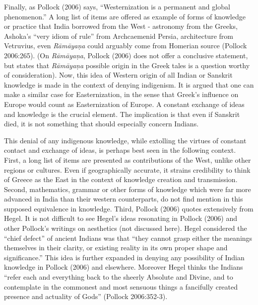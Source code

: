 Finally, as Pollock (2006) says, “Westernization is a permanent and global phenomenon.” A long list of items are offered as example of forms of knowledge or practice that India borrowed from the West - astronomy from the Greeks, Ashoka’s “very idiom of rule” from  Archcaemenid Persia, architecture from Vetruvius, even {\sl Rāmāyaṇa} could arguably come from Homerian source (Pollock 2006:265). (On  {\sl Rāmāyaṇa}, Pollock (2006) does not offer a conclusive statement, but states that {\sl Rāmāyaṇa} possible origin in the Greek tales is a question worthy of consideration). Now, this idea of Western origin of all Indian or Sanskrit knowledge is made in the context of denying indigenism. It is argued that one can make a similar case for Easternization, in the sense that Greek’s influence on Europe would count as Easternization of Europe. A constant exchange of ideas and knowledge is the crucial element. The implication is that even if Sanskrit died, it is not something that should especially concern Indians.

This denial of any indigenous knowledge, while extolling the virtues of constant contact and exchange of ideas, is perhaps best seen in the following context. First, a long list of items are presented as contributions of the West, unlike other regions or cultures. Even if geographically accurate, it strains credibility to think of Greece as the East in the context of knowledge creation and transmission. Second, mathematics, grammar or other forms of knowledge which were far more advanced in India than their western counterparts, do not find mention in this supposed equivalence in knowledge. Third, Pollock (2006) quotes extensively from Hegel. It is not difficult to see Hegel’s ideas resonating in Pollock (2006) and other Pollock’s writings on aesthetics (not discussed here). Hegel considered the “chief defect” of ancient Indians was that “they cannot grasp either the meanings themselves in their clarity, or existing reality in its own proper shape and significance.” This idea is further expanded in denying any possibility of Indian knowledge in Pollock (2006) and elsewhere. Moreover Hegel thinks the Indians “refer each and everything back to the sheerly Absolute and Divine, and to contemplate in the commonest and most sensuous things a fancifully created presence and actuality of Gods” (Pollock 2006:352-3).

